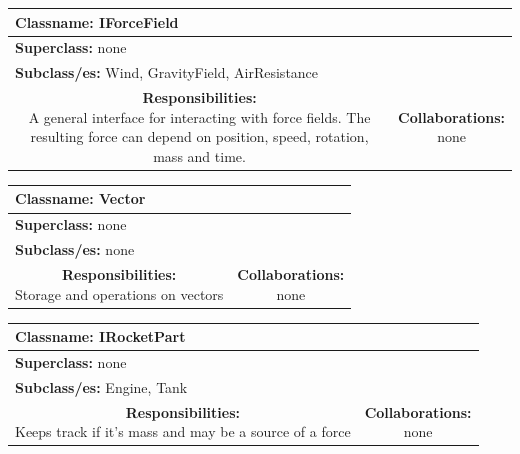 \documentclass{article}
\begin{document}
\begin {center}
\begin{tabular}{|c|c|}
\hline
\multicolumn{2}{|l|}{\textbf{Classname:} IForceField}\\
\hline
\multicolumn{2}{|l|}{\textbf{Superclass:} none}\\
\multicolumn{2}{|l|}{\textbf{Subclass/es:} Wind, GravityField, AirResistance}\\
\hline
\parbox[]{5cm}{\vspace{3px}\textbf{Responsibilities:} \\A general interface for interacting with force fields. The resulting force can depend on position, speed, rotation, mass and time.\vspace{3px}} & \parbox[]{5cm}{\textbf{Collaborations:}\\none}\\
\hline
 \end{tabular}\vspace{.4cm}

\begin{tabular}{|c|c|}
\hline
\multicolumn{2}{|l|}{\textbf{Classname:} Vector}\\
\hline
\multicolumn{2}{|l|}{\textbf{Superclass:} none}\\
\multicolumn{2}{|l|}{\textbf{Subclass/es:} none}\\
\hline
\parbox[]{5cm}{\vspace{3px}\textbf{Responsibilities:} \\Storage and operations on vectors\vspace{3px}} & \parbox[]{5cm}{\textbf{Collaborations:}\\none}\\
\hline
 \end{tabular}\vspace{.4cm}

\begin{tabular}{|c|c|}
\hline
\multicolumn{2}{|l|}{\textbf{Classname:} IRocketPart}\\
\hline
\multicolumn{2}{|l|}{\textbf{Superclass:} none}\\
\multicolumn{2}{|l|}{\textbf{Subclass/es:} Engine, Tank}\\
\hline
\parbox[]{5cm}{\vspace{3px}\textbf{Responsibilities:} \\Keeps track if it's mass and may be a source of a force\vspace{3px}} & \parbox[]{5cm}{\textbf{Collaborations:}\\none}\\
\hline
 \end{tabular}\vspace{.4cm}


\end{center}
\end{document}
